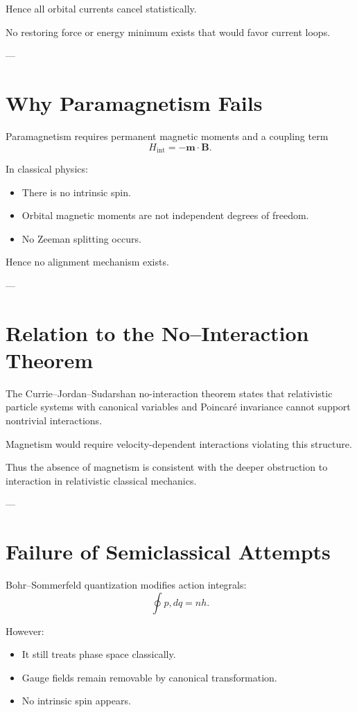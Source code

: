 \documentclass[11pt]{article}
\begin{document}
Hence all orbital currents cancel statistically.

No restoring force or energy minimum exists that would favor current loops.

---

\section{Why Paramagnetism Fails}

Paramagnetism requires permanent magnetic moments and a coupling term
\[
H_{\text{int}} = -\mathbf{m} \cdot \mathbf{B}.
\]

In classical physics:
\begin{itemize}
\item There is no intrinsic spin.
\item Orbital magnetic moments are not independent degrees of freedom.
\item No Zeeman splitting occurs.
\end{itemize}

Hence no alignment mechanism exists.

---

\section{Relation to the No--Interaction Theorem}

The Currie--Jordan--Sudarshan no-interaction theorem states that relativistic particle systems with canonical variables and Poincaré invariance cannot support nontrivial interactions.

Magnetism would require velocity-dependent interactions violating this structure.

Thus the absence of magnetism is consistent with the deeper obstruction to interaction in relativistic classical mechanics.

---

\section{Failure of Semiclassical Attempts}

Bohr--Sommerfeld quantization modifies action integrals:
\[
\oint p , dq = n h.
\]

However:
\begin{itemize}
\item It still treats phase space classically.
\item Gauge fields remain removable by canonical transformation.
\item No intrinsic spin appears.
\end{itemize}
\end{document}

